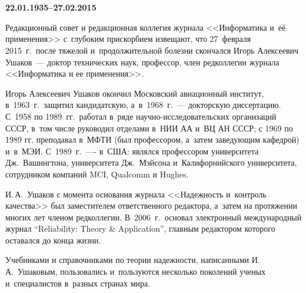    \vspace*{-48pt}

\begin{center}
\vspace*{6pt}
\mbox{%
\epsfxsize=53.502mm
}
\end{center}

\vspace*{6pt} %


   \begin{center}
\\[12pt]
\textbf{\large 22.01.1935--27.02.2015}
   \end{center}



   \vspace*{5mm}

   \thispagestyle{empty}




Редакционный совет и редакционная коллегия журнала <<Информатика и~её применения>> с~глубоким прискорбием извещают, что 27~февраля 2015~г.\ после тяжелой
и~продолжительной болезни скончался Игорь Алексеевич Ушаков~--- доктор технических наук, профессор, член редколлегии журнала <<Информатика и ее применения>>.

Игорь Алексеевич Ушаков окончил Московский авиационный институт, в~1963~г.\ защитил кандидатскую, а~в~1968~г.~--- докторскую диссертацию. С~1958 по 1989~гг.\ работал в~ряде научно-исследовательских организаций СССР, в~том числе руководил отделами в~НИИ АА и~ВЦ АН СССР; с 1969 по 1989 гг. преподавал в~МФТИ (был профессором, а~затем заведующим кафедрой) и~в~МЭИ. С~1989~г.~---- в~США: являлся профессором университета Дж.\ Вашингтона, университета Дж.\ Мэйсона и~Калифорнийского университета, сотрудником компаний MCI, Qualcomm и Hughes.

И.\,А.~Ушаков с момента основания журнала <<Надежность и~контроль качества>> был заместителем ответственного редактора, а~затем на протяжении многих лет членом редколлегии. В~2006~г.\ основал электронный международный журнал ``Reliability: Theory \& Application'', главным редактором которого оставался до конца жизни.

Учебниками и справочниками по теории надежности, написанными И.\,А.~Ушаковым, пользовались и~пользуются несколько поколений ученых и~специалистов в~разных странах мира.

